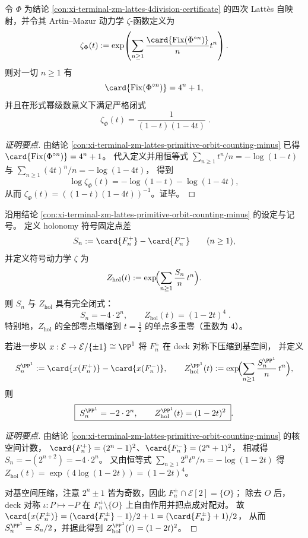 \begin{conclusion}\label{con:xi-terminal-zm-lattes-artin-mazur-zeta}
令 \(\Phi\) 为结论 \ref{con:xi-terminal-zm-lattes-4division-certificate} 的四次 Latt\`es 自映射，并令其 Artin--Mazur 动力学 \(\zeta\)-函数定义为
\[
\zeta_{\Phi}(t):=\exp\!\left(\sum_{n\ge 1}\frac{\card{\mathrm{Fix}(\Phi^{\circ n})}}{n}t^{n}\right).
\]
则对一切 \(n\ge 1\) 有
\[
\card{\mathrm{Fix}(\Phi^{\circ n})}=4^{n}+1,
\]
并且在形式幂级数意义下满足严格闭式
\[
\boxed{\;\zeta_{\Phi}(t)=\frac{1}{(1-t)(1-4t)}\; }.
\]
\end{conclusion}
\begin{proof}[证明要点]
由结论 \ref{con:xi-terminal-zm-lattes-primitive-orbit-counting-minus} 已得 \(\card{\mathrm{Fix}(\Phi^{\circ n})}=4^{n}+1\)。
代入定义并用恒等式
\(
\sum_{n\ge 1}t^{n}/n=-\log(1-t)
\)
与
\(
\sum_{n\ge 1}(4t)^{n}/n=-\log(1-4t)
\)，
得到
\[
\log\zeta_{\Phi}(t)=-\log(1-t)-\log(1-4t),
\]
从而 \(\zeta_{\Phi}(t)=((1-t)(1-4t))^{-1}\)。证毕。
\end{proof}

\begin{conclusion}\label{con:xi-terminal-zm-holonomy-zeta-closed-form-pinning}
沿用结论 \ref{con:xi-terminal-zm-lattes-primitive-orbit-counting-minus} 的设定与记号。
定义 holonomy 符号固定点差
\[
S_n:=\card{F_n^{+}}-\card{F_n^{-}}\qquad(n\ge 1),
\]
并定义符号动力学 \(\zeta\) 为
\[
Z_{\mathrm{hol}}(t):=\exp\!\Bigl(\sum_{n\ge 1}\frac{S_n}{n}\,t^n\Bigr).
\]
则 \(S_n\) 与 \(Z_{\mathrm{hol}}\) 具有完全闭式：
\[
\boxed{\;
S_n=-4\cdot 2^n,
\qquad
Z_{\mathrm{hol}}(t)=(1-2t)^4\; }.
\]
特别地，\(Z_{\mathrm{hol}}\) 的全部零点塌缩到 \(t=\tfrac12\) 的单点多重零（重数为 \(4\)）。
\par
若进一步以 \(x:\mathcal{E}\to\mathcal{E}/\{\pm1\}\cong\PP^{1}\) 将 \(F_n^{\pm}\) 在 deck 对称下压缩到基空间，
并定义
\[
S_n^{\PP^{1}}:=\card{x(F_n^{+})}-\card{x(F_n^{-})},
\qquad
Z_{\mathrm{hol}}^{\PP^{1}}(t):=\exp\!\Bigl(\sum_{n\ge 1}\frac{S_n^{\PP^{1}}}{n}\,t^n\Bigr),
\]
则
\[
\boxed{\;
S_n^{\PP^{1}}=-2\cdot 2^n,
\qquad
Z_{\mathrm{hol}}^{\PP^{1}}(t)=(1-2t)^2\; }.
\]
\end{conclusion}
\begin{proof}[证明要点]
由结论 \ref{con:xi-terminal-zm-lattes-primitive-orbit-counting-minus} 的核空间计数，
\(
\card{F_n^{+}}=(2^n-1)^2
\)、\(
\card{F_n^{-}}=(2^n+1)^2
\)，
相减得 \(S_n=-(2^{n+2})=-4\cdot 2^n\)。
又由恒等式 \(\sum_{n\ge 1}2^n t^n/n=-\log(1-2t)\) 得
\(
Z_{\mathrm{hol}}(t)=\exp(4\log(1-2t))=(1-2t)^4
\)。
\par
对基空间压缩，注意 \(2^n\pm 1\) 皆为奇数，因此 \(F_n^{\pm}\cap \mathcal{E}[2]=\{O\}\)；
除去 \(O\) 后，deck 对称 \(\iota:P\mapsto -P\) 在 \(F_n^{\pm}\setminus\{O\}\) 上自由作用并把点成对配对。
故
\(
\card{x(F_n^{\pm})}=(\card{F_n^{\pm}}-1)/2+1=(\card{F_n^{\pm}}+1)/2
\)，
从而 \(S_n^{\PP^{1}}=S_n/2\)，并据此得到 \(Z_{\mathrm{hol}}^{\PP^{1}}(t)=(1-2t)^2\)。
\end{proof}

